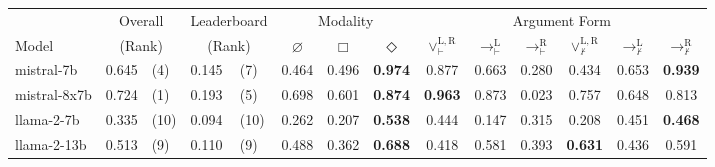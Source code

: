 \small
\setlength{\tabcolsep}{5pt}
\begin{tabular}{
    @{}lllllccccccccc@{}
    }
    \toprule
                   & \multicolumn{2}{c}{Overall} & \multicolumn{2}{c}{Leaderboard} & \multicolumn{3}{c}{Modality} & \multicolumn{6}{c}{Argument Form}                                                                                                                                                                                                                                                           \\
    \cmidrule(lr){6-8} \cmidrule(lr){9-14}
    Model          & \multicolumn{2}{c}{(Rank)}  & \multicolumn{2}{c}{(Rank)}      & $\varnothing$                & $\Box$                            & $\Diamond$     & $\lor^{\mathrm{L},\mathrm{R}}_{\vdash}$ & $\to^\mathrm{L}_{\vdash}$ & $\to^\mathrm{R}_{\vdash}$ & $\lor^{\mathrm{L},\mathrm{R}}_{\nvdash}$ & $\to^\mathrm{L}_{\nvdash}$ & $\to^\mathrm{R}_{\nvdash}$                                   \\
    \midrule
    mistral-7b     & 0.645                       & (4)                             & 0.145                        & (7)                               & 0.464          & 0.496                                   & \textbf{0.974}            & 0.877                     & 0.663                                    & 0.280                      & 0.434                      & 0.653          & \textbf{0.939} \\
    mistral-8x7b   & 0.724                       & (1)                             & 0.193                        & (5)                               & 0.698          & 0.601                                   & \textbf{0.874}            & \textbf{0.963}            & 0.873                                    & 0.023                      & 0.757                      & 0.648          & 0.813          \\
    llama-2-7b     & 0.335                       & (10)                            & 0.094                        & (10)                              & 0.262          & 0.207                                   & \textbf{0.538}            & 0.444                     & 0.147                                    & 0.315                      & 0.208                      & 0.451          & \textbf{0.468} \\
    llama-2-13b    & 0.513                       & (9)                             & 0.110                        & (9)                               & 0.488          & 0.362                                   & \textbf{0.688}            & 0.418                     & 0.581                                    & 0.393                      & \textbf{0.631}             & 0.436          & 0.591          \\

\end{tabular}
